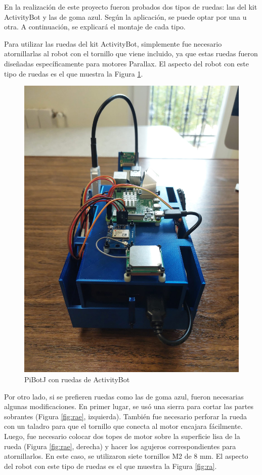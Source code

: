 En la realización de este proyecto fueron probados dos tipos de ruedas: las del kit ActivityBot y las de goma azul. Según la aplicación, se puede optar por una u otra. A continuación, se explicará el montaje de cada tipo.

Para utilizar las ruedas del kit ActivityBot, simplemente fue necesario atornillarlas al robot con el tornillo que viene incluido, ya que estas ruedas fueron diseñadas específicamente para motores Parallax. El aspecto del robot con este tipo de ruedas es el que muestra la Figura \ref{fig:ab}.

\begin{figure} [h!]
	\begin{center}
		\includegraphics[width=12cm]{figs/cap5/ab.jpeg}
	\end{center}
	\caption{PiBotJ con ruedas de ActivityBot} 
	\label{fig:ab}
\end{figure}

Por otro lado, si se prefieren ruedas como las de goma azul, fueron necesarias algunas modificaciones. En primer lugar, se usó una sierra para cortar las partes sobrantes (Figura \ref{fig:rae}, izquierda). También fue necesario perforar la rueda con un taladro para que el tornillo que conecta al motor encajara fácilmente. Luego, fue necesario colocar dos topes de motor sobre la superficie lisa de la rueda (Figura \ref{fig:rae}, derecha) y hacer los agujeros correspondientes para atornillarlos. En este caso, se utilizaron siete tornillos M2 de 8 mm. El aspecto del robot con este tipo de ruedas es el que muestra la Figura \ref{fig:ra}.

